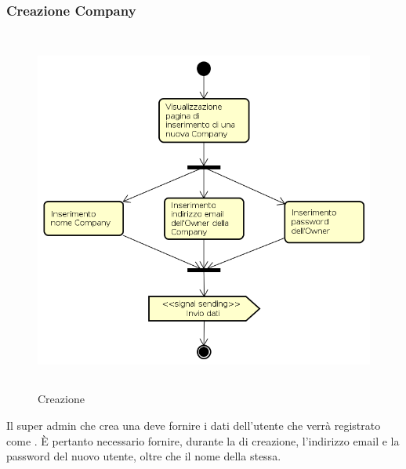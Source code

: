 \subsubsection{Creazione Company}
\begin{figure}[H]
\begin{center}
\includegraphics[height=12cm]{res/sections/backend/activities/creazioneCompanySA.png}
\caption{Creazione }
\end{center}
\end{figure}
Il super admin che crea una  deve fornire i dati dell'utente che verrà registrato come . È pertanto necessario fornire, durante la  di creazione, l'indirizzo email e la password del nuovo utente, oltre che il nome della  stessa.
